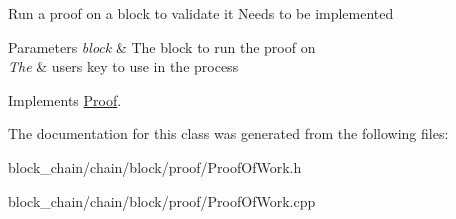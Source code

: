 Run a proof on a block to validate it Needs to be implemented


\begin{DoxyParams}{Parameters}
{\em block} & The block to run the proof on \\
\hline
{\em The} & user\textquotesingle{}s key to use in the process \\
\hline
\end{DoxyParams}


Implements \mbox{\hyperlink{classProof_a8a43fcb7c997da54d627e0f257adb86f}{Proof}}.



The documentation for this class was generated from the following files\+:\begin{DoxyCompactItemize}
\item 
block\+\_\+chain/chain/block/proof/Proof\+Of\+Work.\+h\item 
block\+\_\+chain/chain/block/proof/Proof\+Of\+Work.\+cpp\end{DoxyCompactItemize}
